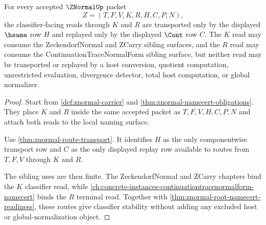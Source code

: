 \begin{theorem}
\label{thm:znormal-root-classifier-stability}
For every accepted $\ZNormalUp$ packet
$$
Z=(T,F,V,K,R,H,C,P,N),
$$
the classifier-facing reads through $K$ and $R$ are transported only by the displayed $\hsame$ row $H$ and replayed only by the displayed $\Cont$ row $C$. The $K$ read may consume the ZeckendorfNormal and ZCarry sibling surfaces, and the $R$ read may consume the ContinuationTraceNormalForm sibling surface, but neither read may be transported or replayed by a host conversion, quotient computation, unrestricted evaluation, divergence detector, total host computation, or global normalizer.
\end{theorem}
\begin{proof}
Start from \autoref{def:znormal-carrier} and \autoref{thm:znormal-namecert-obligations}. They place $K$ and $R$ inside the same accepted packet as $T,F,V,H,C,P,N$ and attach both reads to the local naming surface.

Use \autoref{thm:znormal-route-transport}. It identifies $H$ as the only componentwise transport row and $C$ as the only displayed replay row available to routes from $T,F,V$ through $K$ and $R$.

The sibling uses are then finite. The ZeckendorfNormal and ZCarry chapters bind the $K$ classifier read, while \autoref{ch:concrete-instances-continuationtracenormalform-namecert} binds the $R$ terminal read. Together with \autoref{thm:znormal-root-namecert-readiness}, these routes give classifier stability without adding any excluded host or global-normalization object.
\end{proof}

